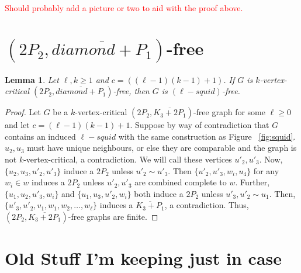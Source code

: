 \documentclass[11pt]{article}
\newtheorem{lemma}[theorem]{Lemma}
\theoremstyle{definition}
\begin{document}
\textcolor{red}{Should probably add a picture or two to aid with the proof above.}

\section{$(2P_2, \overline{diamond + P_1})$-free}

\begin{lemma}\label{lem:compdiamondplusP1}
Let $\ell,k\ge 1$ and $c=((\ell-1)(k-1)+1)$. If $G$ is $k$-vertex-critical $(2P_2, \overline{diamond+P_1})$-free, then $G$ is $(\ell-squid)$-free.
\end{lemma}
\begin{proof}
Let $G$ be a $k$-vertex-critical $(2P_2, \overline{K_3 + 2P_1})$-free graph for some $\ell \ge 0$ and let $c = (\ell - 1)(k - 1) + 1$. Suppose by way of contradiction that $G$ contains an induced $\ell-squid$ with the same construction as Figure ~\ref{fig:squid}.
$u_2, u_3$ must have unique neighbours, or else they are comparable and the graph is not $k$-vertex-critical, a contradiction. We will call these vertices $u'_2, u'_3$. Now, $\{ u_2, u_3, u'_2, u'_3 \}$ induce a $2P_2$ unless $u'_2 \sim u'_3$. Then $\{ u'_2, u'_3, w_i, u_4 \}$ for any $w_i \in w$ induces a $2P_2$ unless $u'_2, u'_3$ are combined complete to $w$. Further, $\{ u_1, u_2, u'_3, w_i \}$ and $\{ u_1, u_3, u'_2, w_i \}$ both induce a $2P_2$ unless $u'_3, u'_2 \sim u_1$. Then, $\{ u'_3, u'_2, v_1, w_1, w_2, \dots, w_\ell \}$ induces a $\overline{K_3 + P_1}$, a contradiction. Thus, $(2P_2, \overline{K_3 + 2P_1})$-free graphs are finite.
\end{proof}


\section{Old Stuff I'm keeping just in case}
\end{document}
